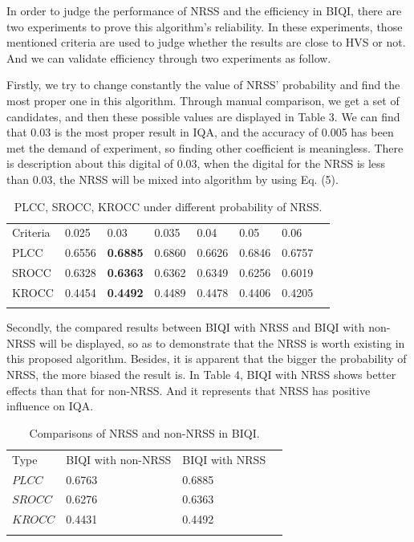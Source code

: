 \par In order to judge the performance of NRSS and the efficiency in BIQI, there are two experiments to prove this algorithm's reliability. In these experiments, those mentioned criteria are used to judge whether the results are close to HVS or not. And we can validate efficiency through two experiments as follow. 
\par Firstly, we try to change constantly the value of NRSS' probability and find the most proper one in this algorithm. Through manual comparison, we get a set of candidates, and then these possible values are displayed in Table 3. We can find that 0.03 is the most proper result in IQA, and the accuracy of 0.005 has been met the demand of experiment, so finding other coefficient is meaningless. There is description about this digital of 0.03, when the digital for the NRSS is less than 0.03, the NRSS will be mixed into algorithm by using Eq. (5). 


\begin{table}
\caption{PLCC, SROCC, KROCC under different probability of NRSS.}
\label{tab:3}       
\begin{tabular}{llllllll}
\hline\noalign{\smallskip}
Criteria & 0.025 & 0.03 & 0.035 & 0.04 & 0.05 & 0.06 & \\
\noalign{\smallskip}\hline\noalign{\smallskip}
PLCC	&0.6556    &\textbf{0.6885}	&0.6860 	&0.6626  	&0.6846	&0.6757\\
SROCC	&0.6328    &\textbf{0.6363}	&0.6362 	&0.6349  	&0.6256	&0.6019\\
KROCC	&0.4454    &\textbf{0.4492}	&0.4489 	&0.4478  	&0.4406	&0.4205\\
\noalign{\smallskip}\hline
\end{tabular}
\end{table}




\par Secondly, the compared results between BIQI with NRSS and BIQI with non-NRSS will be displayed, so as to demonstrate that the NRSS is worth existing in this proposed algorithm. Besides, it is apparent that the bigger the probability of NRSS, the more biased the result is. In Table 4, BIQI with NRSS shows better effects than that for non-NRSS. And it represents that NRSS has positive influence on IQA.


\begin{table}
\caption{Comparisons of NRSS and non-NRSS in BIQI.}
\label{tab:4}       
\begin{tabular}{llll}
\hline\noalign{\smallskip}
Type & BIQI with non-NRSS & BIQI with NRSS &\\
\noalign{\smallskip}\hline\noalign{\smallskip}
$PLCC		$  &0.6763    	&0.6885			\\
$SROCC		$  &0.6276     	&0.6363			\\
$KROCC		$  &0.4431    	&0.4492			\\
\noalign{\smallskip}\hline
\end{tabular}
\end{table}







